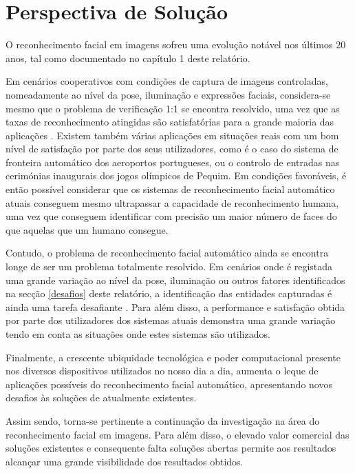 \chapter{Perspectiva de Solução} \label{chap:solução}

O reconhecimento facial em imagens sofreu uma evolução notável nos últimos 20 anos, tal como documentado no capítulo 1 deste relatório. 

Em cenários cooperativos com condições de captura de imagens controladas, nomeadamente ao nível da pose, iluminação e expressões faciais, considera-se mesmo que o problema de verificação 1:1 se encontra resolvido, uma vez que as taxas de reconhecimento atingidas são satisfatórias para a grande maioria das aplicações \citep{Li2011}. Existem também várias aplicações em situações reais com um bom nível de satisfação por parte dos seus utilizadores, como é o caso do sistema de fronteira automático dos aeroportos portugueses, ou o controlo de entradas nas cerimónias inaugurais dos jogos olímpicos de Pequim. Em condições favoráveis, é então possível considerar que os sistemas de reconhecimento facial automático atuais conseguem mesmo ultrapassar a capacidade de reconhecimento humana, uma vez que conseguem identificar com precisão um maior número de faces do que aquelas que um humano consegue.

Contudo, o problema de reconhecimento facial automático ainda se encontra longe de ser um problema totalmente resolvido. Em cenários onde é registada uma grande variação ao nível da pose, iluminação ou outros fatores identificados na secção \ref{desafios} deste relatório, a identificação das entidades capturadas é ainda uma tarefa desafiante  \citep{Li2011}. Para além disso, a performance e satisfação obtida por parte dos utilizadores dos sistemas atuais demonstra uma grande variação tendo em conta as situações onde estes sistemas são utilizados. 

Finalmente, a crescente ubiquidade tecnológica e poder computacional presente nos diversos dispositivos utilizados no nosso dia a dia, aumenta o leque de aplicações possíveis do reconhecimento facial automático, apresentando novos desafios às soluções de atualmente existentes.

Assim sendo, torna-se pertinente a continuação da investigação na área do reconhecimento facial em imagens. Para além disso, o elevado valor comercial das soluções existentes e consequente falta soluções abertas permite aos resultados alcançar uma grande visibilidade dos resultados obtidos.

